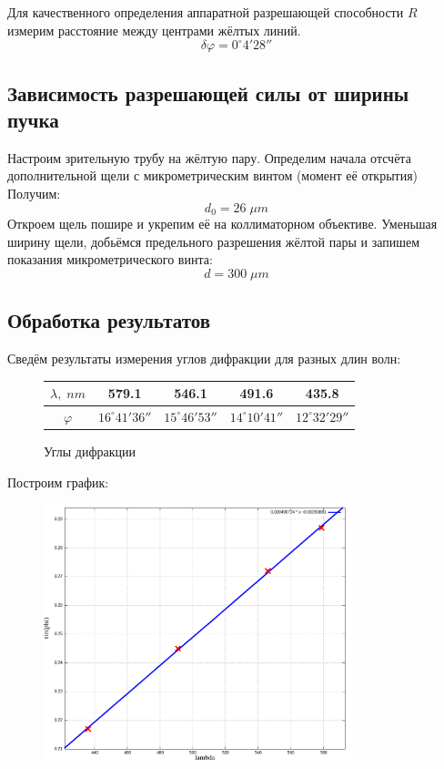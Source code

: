 \documentclass{article}
\begin{document}
Для качественного определения аппаратной разрешающей способности \(R\) измерим расстояние между центрами
жёлтых линий.
\[ \delta\varphi = 0^{\circ}4'28'' \]

\subsection{Зависимость разрешающей силы от ширины пучка}
Настроим зрительную трубу на жёлтую пару. Определим начала отсчёта дополнительной щели с микрометрическим
винтом (момент её открытия) Получим:
\[ d_0 = 26\; \mu m \]
Откроем щель пошире и укрепим её на коллиматорном объективе. Уменьшая ширину щели, добьёмся предельного
разрешения жёлтой пары и запишем показания микрометрического винта:
\[ d = 300\; \mu m \]

\subsection{Обработка результатов}
Сведём результаты измерения углов дифракции для разных длин волн:
\begin{figure}[H]
  \centering
  \begin{tabular}{|c|c|c|c|c|}
    \hline
    \(\lambda, \; nm\) & 579.1 & 546.1 & 491.6 & 435.8 \\\hline
    \(\varphi\) & \( 16^{\circ}41'36'' \) & \( 15^{\circ}46'53'' \) & \( 14^{\circ}10'41'' \) & \( 12^{\circ}32'29'' \) \\\hline
  \end{tabular}
  \caption{Углы дифракции}
\end{figure}

Построим график:
\begin{figure}[H]
  \centering
  \includegraphics[width=0.8\textwidth]{sin.png}
\end{figure}
\end{document}
